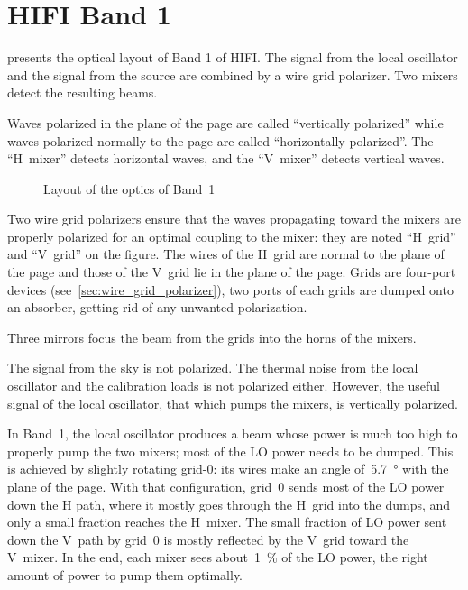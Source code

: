 \section{HIFI Band 1}
 presents the optical layout of Band 1 of HIFI.
The signal from the local oscillator and the signal from the source are combined by a wire grid polarizer.
Two mixers detect the resulting beams.

Waves polarized in the plane of the page are called ``vertically polarized'' while waves polarized normally to the page are called ``horizontally polarized''.
The ``H~mixer'' detects horizontal waves, and the ``V~mixer'' detects vertical waves.

\begin{figure}[hbtp]
    \centering
    \footnotesize
    
    \caption{Layout of the optics of Band~1}
    \label{fig:band1_layout}
\end{figure}

Two wire grid polarizers ensure that the waves propagating toward the mixers are properly polarized for an optimal coupling to the mixer: they are noted ``H~grid'' and ``V~grid'' on the figure.
The wires of the H~grid are normal to the plane of the page and those of the V~grid lie in the plane of the page.
Grids are four-port devices (see~\cref{sec:wire_grid_polarizer}), two ports of each grids are dumped onto an absorber, getting rid of any unwanted polarization.

Three mirrors focus the beam from the grids into the horns of the mixers.

The signal from the sky is not polarized.
The thermal noise from the local oscillator and the calibration loads is not polarized either.
However, the useful signal of the local oscillator, that which pumps the mixers, is vertically polarized.

In Band~1, the local oscillator produces a beam whose power is much too high to properly pump the two mixers; most of the LO power needs to be dumped.
This is achieved by slightly rotating grid-0: its wires make an angle of~\SI{5.7}{\degree} with the plane of the page.
With that configuration, grid~0 sends most of the LO power down the H path, where it mostly goes through the H~grid into the dumps, and only a small fraction reaches the H~mixer.
The small fraction of LO power sent down the V~path by grid~0 is mostly reflected by the V~grid toward the V~mixer.
In the end, each mixer sees about~\SI{1}{\percent} of the LO power, the right amount of power to pump them optimally.

